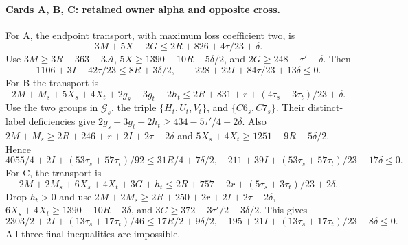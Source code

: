 \documentclass[11pt,letterpaper]{article}
\theoremstyle{definition}\newtheorem{definition}[theorem]{Definition}
\begin{document}
\paragraph{Cards A, B, C: retained owner alpha and opposite cross.}
For A, the endpoint transport, with maximum loss coefficient two, is
\[
 3M+5X+2G\le2R+826+4\tau/23+\delta.
\]
Use $3M\ge3R+363+3\mathcal A$,
$5X\ge1390-10R-5\delta/2$, and
$2G\ge248-\tau'-\delta$. Then
\[
 1106+3I+42\tau/23\le8R+3\delta/2,
 \qquad 228+22I+84\tau/23+13\delta\le0.
\]
For B the transport is
\[
 2M+M_s+5X_s+4X_t+2g_s+3g_t+2h_t
 \le2R+831+r+(4\tau_s+3\tau_t)/23+\delta.
\]
Use the two groups in $\mathcal G_s$, the triple $\{H_t,U_t,V_t\}$,
and $\{C6_s,C7_s\}$. Their distinct-label deficiencies give
$2g_s+3g_t+2h_t\ge434-5\tau'/4-2\delta$.
Also $2M+M_s\ge2R+246+r+2I+2\tau+2\delta$ and
$5X_s+4X_t\ge1251-9R-5\delta/2$. Hence
\[
 4055/4+2I+(53\tau_s+57\tau_t)/92\le31R/4+7\delta/2,
 \quad211+39I+(53\tau_s+57\tau_t)/23+17\delta\le0.
\]
For C, the transport is
\[
 2M+2M_s+6X_s+4X_t+3G+h_t
 \le2R+757+2r+(5\tau_s+3\tau_t)/23+2\delta.
\]
Drop $h_t>0$ and use $2M+2M_s\ge2R+250+2r+2I+2\tau+2\delta$,
$6X_s+4X_t\ge1390-10R-3\delta$, and
$3G\ge372-3\tau'/2-3\delta/2$. This gives
\[
 2303/2+2I+(13\tau_s+17\tau_t)/46\le17R/2+9\delta/2,
 \quad195+21I+(13\tau_s+17\tau_t)/23+8\delta\le0.
\]
All three final inequalities are impossible.
\end{document}
